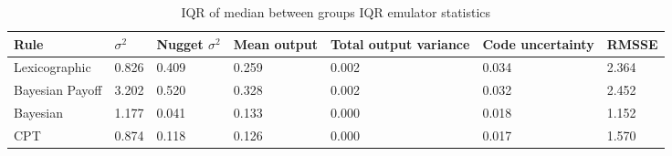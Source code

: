 \begin{table}[H]
\caption{IQR of median between groups IQR emulator statistics \label{tab:sa_emulator_iqr_iqr}}
\begin{tabular} {jjjjjjj}
\hline
Rule & \(\sigma^2\) & Nugget \(\sigma^2\) & Mean output & Total output variance & Code uncertainty & RMSSE \\ \hline
Lexicographic & 0.826 & 0.409 & 0.259 & 0.002 & 0.034 & 2.364 \\ \hline
Bayesian Payoff & 3.202 & 0.520 & 0.328 & 0.002 & 0.032 & 2.452 \\ \hline
Bayesian & 1.177 & 0.041 & 0.133 & 0.000 & 0.018 & 1.152 \\ \hline
\ac{CPT} & 0.874 & 0.118 & 0.126 & 0.000 & 0.017 & 1.570 \\ \hline
\end{tabular}
\end{table}

